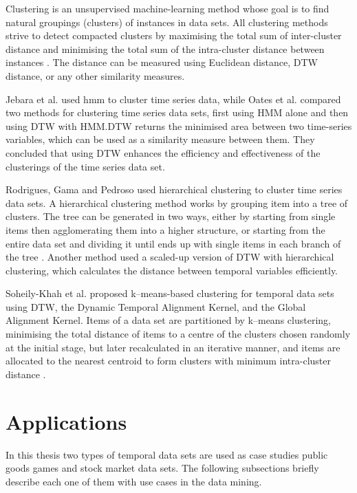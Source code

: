 Clustering is an unsupervised machine-learning method whose goal is to find natural groupings (clusters) of instances in data sets. All clustering methods strive to detect compacted clusters by maximising the total sum of inter-cluster distance and minimising the total sum of the intra-cluster distance between instances \cite{Esling2012}. The distance can be measured using Euclidean distance, DTW distance, or any other similarity measures.


Jebara et al. \cite{Jebara2007} used \acrfull{hmm} to cluster time series data, while Oates et al. \cite{Oates1999} compared two methods for clustering time series data sets, first using HMM alone and then using DTW with HMM.DTW returns the minimised area between two time-series variables, which can be used as a similarity measure between them. They concluded that using DTW enhances the efficiency and effectiveness of the clusterings of the time series data set.


Rodrigues, Gama and Pedroso \cite{Rodrigues2008} used hierarchical clustering to cluster time series data sets. A hierarchical clustering method works by grouping item into a tree of clusters. The tree can be generated in two ways, either by starting from single items then agglomerating them into a higher structure, or starting from the entire data set and dividing it until ends up with single items in each branch of the tree \cite{WarrenLiao2005}. Another method used a scaled-up version of DTW \cite{Keogh2000} with hierarchical clustering, which calculates the distance between temporal variables efficiently.

Soheily-Khah et al. \cite{Soheily-Khah2016} proposed k--means-based clustering for temporal data sets using DTW, the Dynamic Temporal Alignment Kernel, and the Global Alignment Kernel. Items of a data set are partitioned by k--means clustering, minimising the total distance of items to a centre of the clusters chosen randomly at the initial stage, but later recalculated in an iterative manner, and items are allocated to the nearest centroid to form clusters with minimum intra-cluster distance \cite{Zaki2014}.



\section{Applications}
In this thesis two types of temporal data sets are used as case studies public goods games and stock market data sets. The following subsections briefly describe each one of them with use cases in the data mining.


